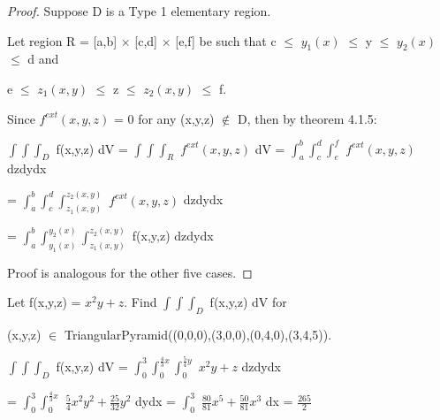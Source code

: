     \begin{proof}
        Suppose D is a Type 1 elementary region.

        Let region R = [a,b] $\times$ [c,d] $\times$ [e,f] be such that
        c $\leq$ $y_1(x)$ $\leq$ y $\leq$ $y_2(x)$ $\leq$ d and
        
        e $\leq$ $z_1(x,y)$ $\leq$ z $\leq$ $z_2(x,y)$ $\leq$ f.

        Since $f^{ext}(x,y,z)$ = 0 for any
        (x,y,z) $\not \in$ D, then by {\color{red} theorem 4.1.5}:

        \hspace{0.5cm}
        $\int \int \int_D$ f(x,y,z) dV
        = $\int \int \int_R$ $f^{ext}(x,y,z)$ dV
        = $\int_a^b \int_c^d \int_e^f$ $f^{ext}(x,y,z)$ dzdydx
        
        \hspace{3.9cm}
        = $\int_a^b \int_c^d \int_{z_1(x,y)}^{z_2(x,y)}$ $f^{ext}(x,y,z)$ dzdydx

        \hspace{3.9cm}
        = $\int_a^b \int_{y_1(x)}^{y_2(x)} \int_{z_1(x,y)}^{z_2(x,y)}$
        f(x,y,z) dzdydx

        Proof is analogous for the other five cases.
    \end{proof}

    \vspace{0.5cm}



    \begin{example}
        Let f(x,y,z) = $x^2y + z$.
        Find $\int \int \int_D$ f(x,y,z) dV for

        (x,y,z) $\in$ TriangularPyramid((0,0,0),(3,0,0),(0,4,0),(3,4,5)).
    \end{example}

    \begin{tbox}
        $\int \int \int_D$ f(x,y,z) dV
        = $\int_0^3 \int_0^{\frac{4}{3}x} \int_0^{\frac{5}{4}y}$
            $x^2y + z$ dzdydx

        \hspace{3.3cm}
        = $\int_0^3 \int_0^{\frac{4}{3}x}$
            $\frac{5}{4}x^2y^2 + \frac{25}{32}y^2$ dydx
        = $\int_0^3$ $\frac{80}{81}x^5 + \frac{50}{81}x^3$ dx
        = $\frac{265}{2}$
    \end{tbox}
    
    \vspace{0.5cm}



